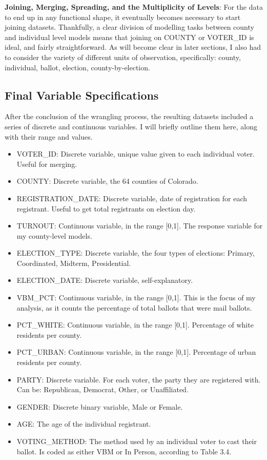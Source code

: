 \documentclass[12pt,twoside]{reedthesis}
\providecommand{\tightlist}{%
  \setlength{\itemsep}{0pt}\setlength{\parskip}{0pt}}
\begin{document}
  \textbf{Joining, Merging, Spreading, and the Multiplicity of Levels}:
  For the data to end up in any functional shape, it eventually becomes
  necessary to start joining datasets. Thankfully, a clear division of
  modelling tasks between county and individual level models means that
  joining on COUNTY or VOTER\_ID is ideal, and fairly straightforward. As
  will become clear in later sections, I also had to consider the variety
  of different units of observation, specifically: county, individual,
  ballot, election, county-by-election.
  
  \subsection{Final Variable
  Specifications}\label{final-variable-specifications}
  
  After the conclusion of the wrangling process, the resulting datasets
  included a series of discrete and continuous variables. I will briefly
  outline them here, along with their range and values.
  
  \begin{itemize}
  \tightlist
  \item
    VOTER\_ID: Discrete variable, unique value given to each individual
    voter. Useful for merging.
  \item
    COUNTY: Discrete variable, the 64 counties of Colorado.
  \item
    REGISTRATION\_DATE: Discrete variable, date of registration for each
    registrant. Useful to get total registrants on election day.
  \item
    TURNOUT: Continuous variable, in the range {[}0,1{]}. The response
    variable for my county-level models.
  \item
    ELECTION\_TYPE: Discrete variable, the four types of elections:
    Primary, Coordinated, Midterm, Presidential.
  \item
    ELECTION\_DATE: Discrete variable, self-explanatory.
  \item
    VBM\_PCT: Continuous variable, in the range {[}0,1{]}. This is the
    focus of my analysis, as it counts the percentage of total ballots
    that were mail ballots.
  \item
    PCT\_WHITE: Continuous variable, in the range {[}0,1{]}. Percentage of
    white residents per county.
  \item
    PCT\_URBAN: Continuous variable, in the range {[}0,1{]}. Percentage of
    urban residents per county.
  \item
    PARTY: Discrete variable. For each voter, the party they are
    registered with. Can be: Republican, Democrat, Other, or Unaffiliated.
  \item
    GENDER: Discrete binary variable, Male or Female.
  \item
    AGE: The age of the individual registrant.
  \item
    VOTING\_METHOD: The method used by an individual voter to cast their
    ballot. Is coded as either VBM or In Person, according to Table 3.4.
  \end{itemize}
  
\end{document}
